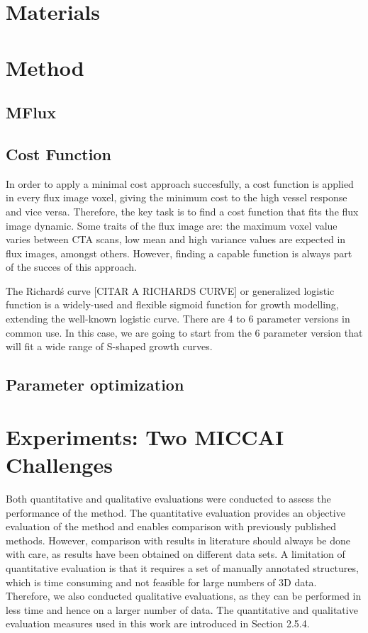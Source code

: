 \section{Materials}

\section{Method}

\subsection{MFlux}

\subsection{Cost Function}

In order to apply a minimal cost approach succesfully, a cost function is applied in every flux image voxel, giving the minimum cost to the high vessel response and vice versa. Therefore, the key task is to find a cost function that fits the flux image dynamic. Some traits of the flux image are: the maximum voxel value varies between CTA scans, low mean and high variance values are expected in flux images, amongst others. However, finding a capable function is always part of the succes of this approach.

The Richard\'s curve [CITAR A RICHARDS CURVE] or generalized logistic function is a widely-used and flexible sigmoid function for growth modelling, extending the well-known logistic curve. There are 4 to 6 parameter versions in common use. In this case, we are going to start from the 6 parameter version that will fit a wide range of S-shaped growth curves.

\subsection{Parameter optimization}

\section{Experiments: Two MICCAI Challenges}

Both quantitative and qualitative evaluations were conducted to assess the performance of the method. The quantitative evaluation provides an objective evaluation of the method and enables comparison with previously published methods. However, comparison with results in literature should always be done with care, as results have been obtained on different data sets. A limitation of quantitative evaluation is that it requires a set of manually annotated structures, which is time consuming and not feasible for large numbers of 3D data. Therefore, we also conducted qualitative evaluations, as they can be performed in less time and hence on a larger number of data. The quantitative and qualitative evaluation measures used in this work are introduced in Section 2.5.4.


